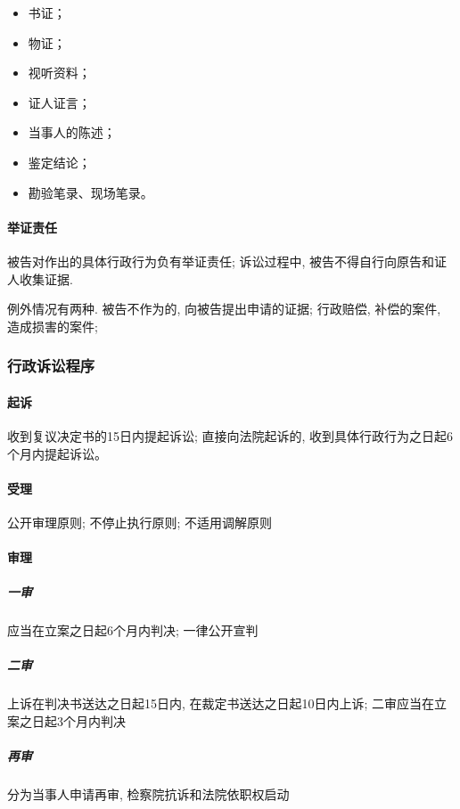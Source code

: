 \begin{itemize}
	\item 书证；
	\item 物证；
	\item 视听资料；
	\item 证人证言；
	\item 当事人的陈述；
	\item 鉴定结论；
	\item 勘验笔录、现场笔录。
\end{itemize}

\paragraph{举证责任} 被告对作出的具体行政行为负有举证责任; 诉讼过程中, 被告不得自行向原告和证人收集证据.

例外情况有两种. 被告不作为的, 向被告提出申请的证据; 行政赔偿, 补偿的案件, 造成损害的案件;

\subsubsection{行政诉讼程序}

\paragraph{起诉} 收到复议决定书的15日内提起诉讼; 直接向法院起诉的, 收到具体行政行为之日起6个月内提起诉讼。

\paragraph{受理} 公开审理原则; 不停止执行原则; 不适用调解原则

\paragraph{审理}

\subparagraph{一审} 应当在立案之日起6个月内判决; 一律公开宣判

\subparagraph{二审} 上诉在判决书送达之日起15日内, 在裁定书送达之日起10日内上诉; 二审应当在立案之日起3个月内判决

\subparagraph{再审} 分为当事人申请再审, 检察院抗诉和法院依职权启动
